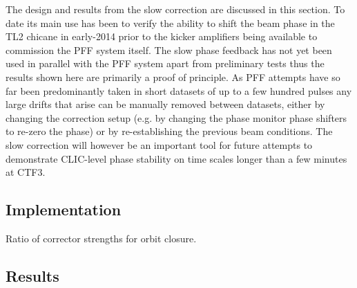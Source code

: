The design and results from the slow correction are discussed in this section. To date its main use has been to verify the ability to shift the beam phase in the TL2 chicane in early-2014 prior to the kicker amplifiers being available to commission the PFF system itself. The slow phase feedback has not yet been used in parallel with the PFF system apart from preliminary tests thus the results shown here are primarily a proof of principle. As PFF attempts have so far been predominantly taken in short datasets of up to a few hundred pulses any large drifts that arise can be manually removed between datasets, either by changing the correction setup (e.g. by changing the phase monitor phase shifters to re-zero the phase) or by re-establishing the previous beam conditions. The slow correction will however be an important tool for future attempts to demonstrate CLIC-level phase stability on time scales longer than a few minutes at CTF3.

\subsection{Implementation}
\label{ss:slowCorrMethod}

Ratio of corrector strengths for orbit closure.

\subsection{Results}
\label{ss:slowCorrResults}




